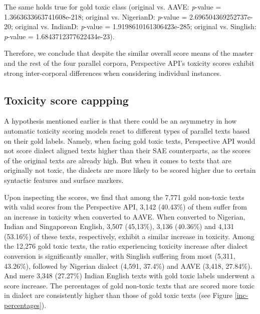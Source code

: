 \documentclass[11pt]{article}
\begin{document}
The same holds true for gold toxic class (original vs. AAVE: \textit{p}-value = 1.3663633663741608e-218; original vs. NigerianD: \textit{p}-value = 2.696504369252737e-20; original vs. IndianD: \textit{p}-value = 1.9198610161306423e-285; original vs. Singlish: \textit{p}-value = 1.6843712377622434e-23).

Therefore, we conclude that despite the similar overall score means of the master and the rest of the four parallel corpora, Perspective API’s toxicity scores exhibit strong inter-corporal differences when considering individual instances.

\subsection{Toxicity score cappping}

A hypothesis mentioned earlier is that there could be an asymmetry in how automatic toxicity scoring models react to different types of parallel texts based on their gold labels. Namely, when facing gold toxic texts, Perspective API would not score dialect aligned texts higher than their SAE counterparts, as the scores of the original texts are already high. But when it comes to texts that are originally not toxic, the dialects are more likely to be scored higher due to certain syntactic features and surface markers.

Upon inspecting the scores, we find that among the 7,771 gold non-toxic texts with valid scores from the Perspective API, 3,142 (40.43\%) of them suffer from an increase in toxicity when converted to AAVE. When converted to Nigerian, Indian and Singaporean English, 3,507 (45,13\%), 3,136 (40.36\%) and 4,131 (53.16\%) of these texts, respectively, exhibit a similar increase in toxicity. Among the 12,276 gold toxic texts, the ratio experiencing toxicity increase after dialect conversion is significantly smaller, with Singlish suffering from most (5,311, 43.26\%), followed by Nigerian dialect (4,591, 37.4\%) and AAVE (3,418, 27.84\%). And mere 3,348 (27.27\%) Indian English texts with gold toxic labels underwent a score increase. The percentages of gold non-toxic texts that are scored more toxic in dialect are consistently higher than those of gold toxic texts (see Figure \ref{inc-percentages}).
\end{document}
